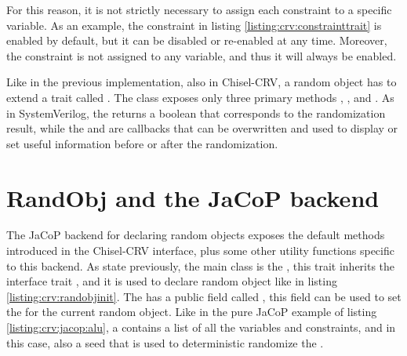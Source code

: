 For this reason, it is not strictly necessary to assign each constraint to a
specific variable. As an example, the  constraint in listing
\ref{listing:crv:constrainttrait} is enabled by default, but it can be disabled
or re-enabled at any time. Moreover, the constraint  is not
assigned to any variable, and thus it will always be enabled.


\par Like in the previous implementation, also in Chisel-CRV, a random object
has to extend a trait called . The  class exposes
only three primary methods , , and
. As in SystemVerilog, the  returns a
boolean that corresponds to the randomization result, while the
 and  are callbacks that can be
overwritten and used to display or set useful information before or after the
randomization.

\section{RandObj and the JaCoP backend}
The JaCoP backend for declaring random objects exposes the default methods
introduced in the Chisel-CRV interface, plus some other utility functions
specific to this backend. As state previously, the main class is the
, this trait inherits the interface trait , and it
is used to declare random object like in listing \ref{listing:crv:randobjinit}.
The  has a public field called , this field
can be used to set the  for the current random object. Like in the
pure JaCoP example of listing \ref{listing:crv:jacop:alu}, a 
contains a list of all the variables and constraints, and in this case, also a
seed that is used to deterministic randomize the .



